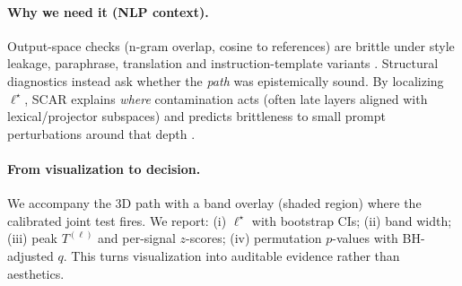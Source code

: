 \documentclass[11pt]{article}
\begin{document}
\paragraph{Why we need it (NLP context).}
Output-space checks (n-gram overlap, cosine to references) are brittle under style leakage, paraphrase, translation and instruction-template variants \citep{ribeiro2020checklist,iyyer2018scpn}. Structural diagnostics instead ask whether the \emph{path} was epistemically sound. By localizing $\ell^\star$, SCAR explains \emph{where} contamination acts (often late layers aligned with lexical/projector subspaces) and predicts brittleness to small prompt perturbations around that depth \citep{raghu2017svcca,kornblith2019cka,ansuini2019intrinsic}.

\paragraph{From visualization to decision.}
We accompany the 3D path with a band overlay (shaded region) where the calibrated joint test fires. We report: (i) $\ell^\star$ with bootstrap CIs; (ii) band width; (iii) peak $T^{(\ell)}$ and per-signal $z$-scores; (iv) permutation $p$-values with BH-adjusted $q$. This turns visualization into auditable evidence rather than aesthetics.
\end{document}
